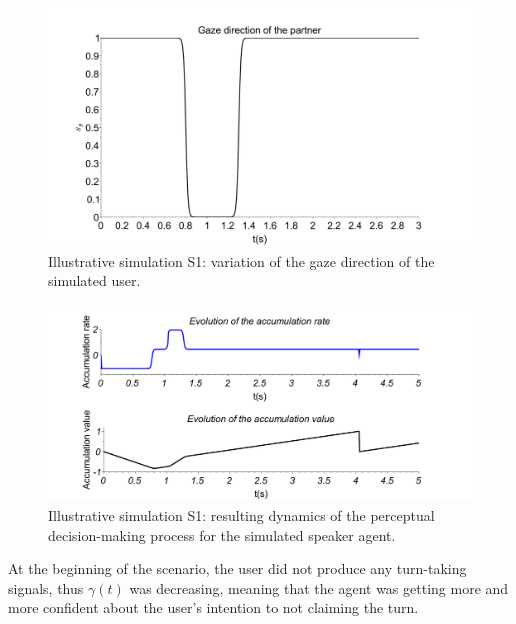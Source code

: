 \begin{figure}
  \center
  \includegraphics[width=\linewidth]{figure/Gaze_partenaire.pdf}
  \caption{Illustrative simulation S1: variation of the gaze direction of the simulated user.}
  \label{fig-gaze-user1}
\end{figure}

\begin{figure}
  \centering
  \includegraphics[width=\linewidth]{figure/illustration_ddm_speaker.pdf}
  \caption{Illustrative simulation S1: resulting dynamics of the perceptual decision-making process for the simulated speaker agent.}
  \label{acc_example}
\end{figure}

At the beginning of the scenario, the user did not produce any turn-taking signals, thus $\gamma(t)$ was decreasing, meaning that the agent was getting more and more confident about the user's intention to not claiming the turn. 

